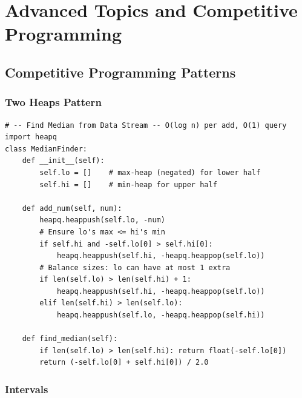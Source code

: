 \documentclass[11pt,a4paper]{report}
\begin{document}
\part{Advanced Topics and Competitive Programming}

\chapter{Competitive Programming Patterns}

\section{Two Heaps Pattern}

\begin{lstlisting}
# -- Find Median from Data Stream -- O(log n) per add, O(1) query
import heapq
class MedianFinder:
    def __init__(self):
        self.lo = []    # max-heap (negated) for lower half
        self.hi = []    # min-heap for upper half

    def add_num(self, num):
        heapq.heappush(self.lo, -num)
        # Ensure lo's max <= hi's min
        if self.hi and -self.lo[0] > self.hi[0]:
            heapq.heappush(self.hi, -heapq.heappop(self.lo))
        # Balance sizes: lo can have at most 1 extra
        if len(self.lo) > len(self.hi) + 1:
            heapq.heappush(self.hi, -heapq.heappop(self.lo))
        elif len(self.hi) > len(self.lo):
            heapq.heappush(self.lo, -heapq.heappop(self.hi))

    def find_median(self):
        if len(self.lo) > len(self.hi): return float(-self.lo[0])
        return (-self.lo[0] + self.hi[0]) / 2.0
\end{lstlisting}

\section{Intervals}
\end{document}
